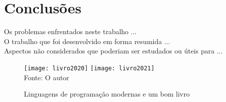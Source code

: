

\chapter{Conclus\~{o}es}
Os problemas enfrentados neste trabalho ...\\
O trabalho que foi desenvolvido em forma resumida ...\\
Aspectos n\~{a}o considerados que poderiam ser estudados ou \'{u}teis para ...\\
   \begin{figure}[H]
    \begin{center}
        \caption{Linguagens de programa\c{c}\~{a}o modernas e um bom livro} \label{ling2}
        \texttt{[image: livro2020]}
        \texttt{[image: livro2021]} \\
        {\tiny \sf Fonte: O autor }
    \end{center}
   \end{figure} 